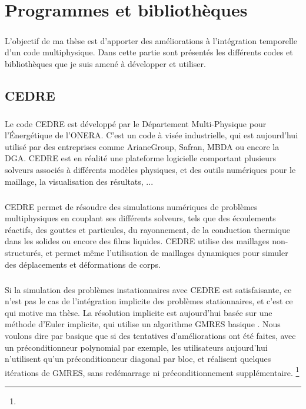 \chapter{Programmes et bibliothèques}

\paragraph{}
L'objectif de ma thèse est d'apporter des améliorations à l'intégration temporelle d'un code multiphysique.
Dans cette partie sont présentés les différents codes et bibliothèques que je suis amené à développer et utiliser.

\section{CEDRE}

  \paragraph{}
  Le code CEDRE est développé par le Département Multi-Physique pour l'Énergétique de l'ONERA.
  C'est un code à visée industrielle, qui est aujourd'hui utilisé par des entreprises comme ArianeGroup, Safran, MBDA ou encore la DGA.
  CEDRE est en réalité une plateforme logicielle comportant plusieurs solveurs associés à différents modèles physiques, et des outils numériques pour le maillage, la visualisation des résultats, ...

  \paragraph{}
  CEDRE permet de résoudre des simulations numériques de problèmes multiphysiques en couplant ses différents solveurs, tels que des écoulements réactifs, des gouttes et particules, du rayonnement, de la conduction thermique dans les solides ou encore des films liquides.
  CEDRE utilise des maillages non-structurés, et permet même l'utilisation de maillages dynamiques pour simuler des déplacements et déformations de corps.

  \paragraph{}
  Si la simulation des problèmes instationnaires avec CEDRE est satisfaisante, ce n'est pas le cas de l'intégration implicite des problèmes stationnaires, et c'est ce qui motive ma thèse.
  La résolution implicite est aujourd'hui basée sur une méthode d'Euler implicite, qui utilise un algorithme GMRES basique \cite{Selva1998}.
  Nous voulons dire par basique que si des tentatives d'améliorations ont été faites, avec un préconditionneur polynomial par exemple, les utilisateurs aujourd'hui n'utilisent qu'un préconditionneur diagonal par bloc, et réalisent quelques itérations de GMRES, sans redémarrage ni préconditionnement supplémentaire.
  \footnote{}

